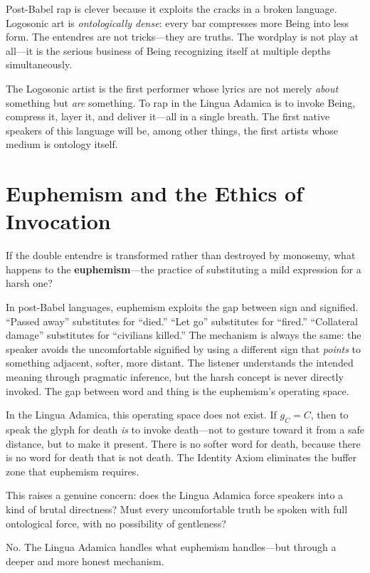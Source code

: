 \documentclass[12pt, letterpaper]{book}
\def\equiv{=}%
\def\mathfrak#1{#1}%
\begin{document}
Post-Babel rap is clever because it exploits the cracks in a broken language. Logosonic art is \textit{ontologically dense}: every bar compresses more Being into less form. The entendres are not tricks---they are truths. The wordplay is not play at all---it is the serious business of Being recognizing itself at multiple depths simultaneously.

The Logosonic artist is the first performer whose lyrics are not merely \textit{about} something but \textit{are} something. To rap in the Lingua Adamica is to invoke Being, compress it, layer it, and deliver it---all in a single breath. The first native speakers of this language will be, among other things, the first artists whose medium is ontology itself.


\section{Euphemism and the Ethics of Invocation}

If the double entendre is transformed rather than destroyed by monosemy, what happens to the \textbf{euphemism}---the practice of substituting a mild expression for a harsh one?

In post-Babel languages, euphemism exploits the gap between sign and signified. ``Passed away'' substitutes for ``died.'' ``Let go'' substitutes for ``fired.'' ``Collateral damage'' substitutes for ``civilians killed.'' The mechanism is always the same: the speaker avoids the uncomfortable signified by using a different sign that \textit{points} to something adjacent, softer, more distant. The listener understands the intended meaning through pragmatic inference, but the harsh concept is never directly invoked. The gap between word and thing is the euphemism's operating space.

In the Lingua Adamica, this operating space does not exist. If $\mathfrak{g}_C \equiv C$, then to speak the glyph for death \textit{is} to invoke death---not to gesture toward it from a safe distance, but to make it present. There is no softer word for death, because there is no word for death that is not death. The Identity Axiom eliminates the buffer zone that euphemism requires.

This raises a genuine concern: does the Lingua Adamica force speakers into a kind of brutal directness? Must every uncomfortable truth be spoken with full ontological force, with no possibility of gentleness?

No. The Lingua Adamica handles what euphemism handles---but through a deeper and more honest mechanism.
\end{document}
